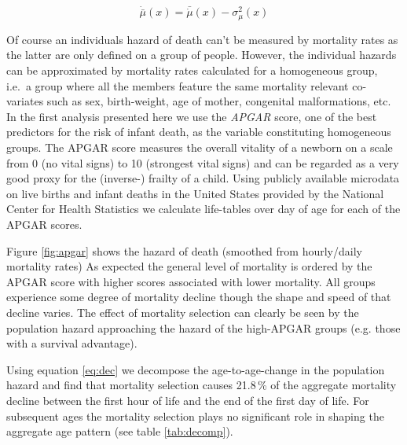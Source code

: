 \documentclass[12pt, parskip=half]{scrartcl}
\begin{document}
\begin{equation}
  \dot{\bar{\mu}}(x) = \bar{\dot{\mu}}(x) - \sigma^2_\mu(x)
  \label{eq:dec}
\end{equation}

Of course an individuals hazard of death can't be measured by mortality rates as the latter are only defined on a group of people. However, the individual hazards can be approximated by mortality rates calculated for a homogeneous group, i.e.~a group where all the members feature the same mortality relevant co-variates such as sex, birth-weight, age of mother, congenital malformations, etc. In the first analysis presented here we use the \emph{APGAR} score, one of the best predictors for the risk of infant death, as the variable constituting homogeneous groups. The APGAR score measures the overall vitality of a newborn on a scale from 0 (no vital signs) to 10 (strongest vital signs) and can be regarded as a very good proxy for the (inverse-) frailty of a child. Using publicly available microdata on live births and infant deaths in the United States provided by the National Center for Health Statistics we calculate life-tables over day of age for each of the APGAR scores.

Figure \ref{fig:apgar} shows the hazard of death (smoothed from hourly/daily mortality rates) As expected the general level of mortality is ordered by the APGAR score with higher scores associated with lower mortality. All groups experience some degree of mortality decline though the shape and speed of that decline varies. The effect of mortality selection can clearly be seen by the population hazard approaching the hazard of the high-APGAR groups (e.g. those with a survival advantage).

Using equation \ref{eq:dec} we decompose the age-to-age-change in the population hazard and find that mortality selection causes 21.8\,\% of the aggregate mortality decline between the first hour of life and the end of the first day of life. For subsequent ages the mortality selection plays no significant role in shaping the aggregate age pattern (see table \ref{tab:decomp}).
\end{document}
